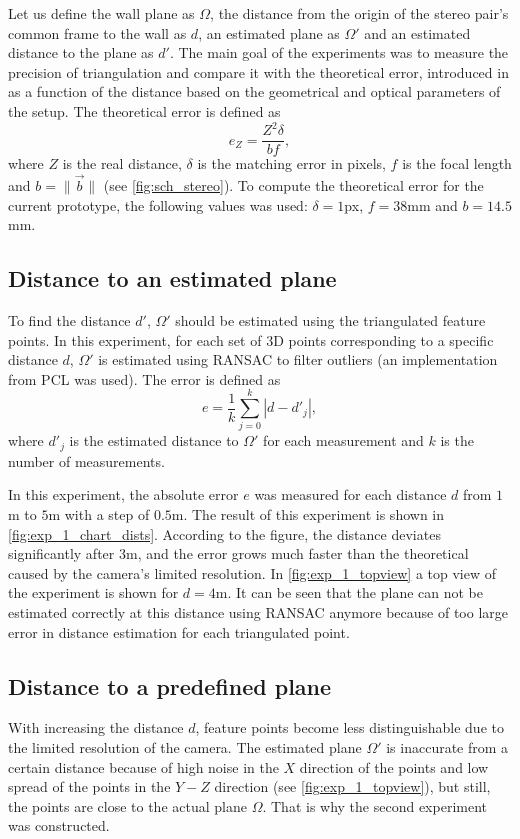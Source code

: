 Let us define the wall plane as $\Omega$, the distance from the origin of the stereo pair's common frame to the wall as $d$, an estimated plane as $\Omega'$ and an estimated distance to the plane as $d'$.
The main goal of the experiments was to measure the precision of triangulation and compare it with the theoretical error, introduced in \cite{cv_theoretical_error} as a function of the distance based on the geometrical and optical parameters of the setup.
The theoretical error is defined as
\begin{equation}
    e_Z = \frac{Z^2 \delta}{bf},
\end{equation}
where $Z$ is the real distance, $\delta$ is the matching error in pixels, $f$ is the focal length and $b = \lVert \vec{b} \rVert$ (see \autoref{fig:sch_stereo}).
To compute the theoretical error for the current prototype, the following values was used: $\delta=1$px, $f=38$mm and $b=14.5$mm.

\subsection{Distance to an estimated plane}
\label{sec:exp1}
To find the distance $d'$, $\Omega'$ should be estimated using the triangulated feature points.
In this experiment, for each set of 3D points corresponding to a specific distance $d$, $\Omega'$ is estimated using RANSAC to filter outliers (an implementation from PCL was used).
The error is defined as
\begin{equation}
    e = \frac{1}{k}\sum_{j=0}^{k}{|d - d'_j|},
\end{equation}
where $d'_j$ is the estimated distance to $\Omega'$ for each measurement and $k$ is the number of measurements.

In this experiment, the absolute error $e$ was measured for each distance $d$ from $1$m to $5$m with a step of $0.5$m.
The result of this experiment is shown in \autoref{fig:exp_1_chart_dists}.
According to the figure, the distance deviates significantly after $3$m, and the error grows much faster than the theoretical caused by the camera's limited resolution.
In \autoref{fig:exp_1_topview} a top view of the experiment is shown for $d=4$m.
It can be seen that the plane can not be estimated correctly at this distance using RANSAC anymore because of too large error in distance estimation for each triangulated point.

\subsection{Distance to a predefined plane}
\label{sec:exp2}
With increasing the distance $d$, feature points become less distinguishable due to the limited resolution of the camera.
The estimated plane $\Omega'$ is inaccurate from a certain distance because of high noise in the $X$ direction of the points and low spread of the points in the $Y-Z$ direction (see \autoref{fig:exp_1_topview}), but still, the points are close to the actual plane $\Omega$.
That is why the second experiment was constructed.

